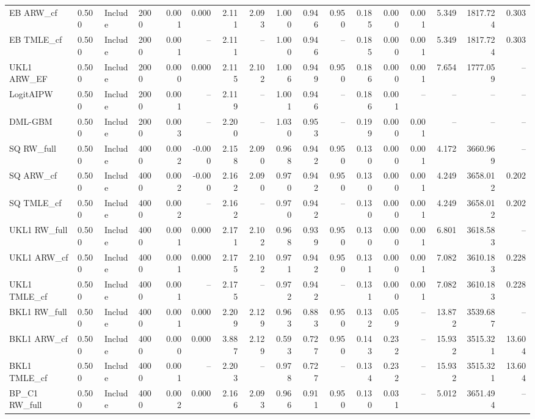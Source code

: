\begin{tabular}{llllrrrrrrrrrrrrr}
EB ARW\_cf & 0.500 & Include & 2000 & 0.001 & 0.000 & 2.111 & 2.093 & 1.000 & 0.946 & 0.950 & 0.185 & 0.000 & 0.001 & 5.349 & 1817.724 & 0.303 \\
EB TMLE\_cf & 0.500 & Include & 2000 & 0.001 & -- & 2.111 & -- & 1.000 & 0.946 & -- & 0.185 & 0.000 & 0.001 & 5.349 & 1817.724 & 0.303 \\
UKL1 ARW\_EF & 0.500 & Include & 2000 & 0.000 & 0.000 & 2.115 & 2.102 & 1.006 & 0.949 & 0.950 & 0.186 & 0.000 & 0.001 & 7.654 & 1777.059 & -- \\
LogitAIPW & 0.500 & Include & 2000 & 0.001 & -- & 2.119 & -- & 1.001 & 0.946 & -- & 0.186 & 0.001 & -- & -- & -- & -- \\
DML-GBM & 0.500 & Include & 2000 & 0.003 & -- & 2.200 & -- & 1.030 & 0.953 & -- & 0.199 & 0.000 & 0.001 & -- & -- & -- \\
SQ RW\_full & 0.500 & Include & 4000 & 0.002 & -0.000 & 2.158 & 2.090 & 0.968 & 0.942 & 0.950 & 0.130 & 0.000 & 0.001 & 4.172 & 3660.969 & -- \\
SQ ARW\_cf & 0.500 & Include & 4000 & 0.002 & -0.000 & 2.162 & 2.090 & 0.970 & 0.942 & 0.950 & 0.130 & 0.000 & 0.001 & 4.249 & 3658.012 & 0.202 \\
SQ TMLE\_cf & 0.500 & Include & 4000 & 0.002 & -- & 2.162 & -- & 0.970 & 0.942 & -- & 0.130 & 0.000 & 0.001 & 4.249 & 3658.012 & 0.202 \\
UKL1 RW\_full & 0.500 & Include & 4000 & 0.001 & 0.000 & 2.171 & 2.102 & 0.968 & 0.939 & 0.950 & 0.130 & 0.000 & 0.001 & 6.801 & 3618.583 & -- \\
UKL1 ARW\_cf & 0.500 & Include & 4000 & 0.001 & 0.000 & 2.175 & 2.102 & 0.971 & 0.942 & 0.950 & 0.131 & 0.000 & 0.001 & 7.082 & 3610.183 & 0.228 \\
UKL1 TMLE\_cf & 0.500 & Include & 4000 & 0.001 & -- & 2.175 & -- & 0.972 & 0.942 & -- & 0.131 & 0.000 & 0.001 & 7.082 & 3610.183 & 0.228 \\
BKL1 RW\_full & 0.500 & Include & 4000 & 0.001 & 0.000 & 2.209 & 2.129 & 0.963 & 0.883 & 0.950 & 0.132 & 0.059 & -- & 13.872 & 3539.687 & -- \\
BKL1 ARW\_cf & 0.500 & Include & 4000 & 0.000 & 0.000 & 3.887 & 2.129 & 0.593 & 0.727 & 0.950 & 0.143 & 0.232 & -- & 15.932 & 3515.321 & 13.604 \\
BKL1 TMLE\_cf & 0.500 & Include & 4000 & 0.001 & -- & 2.203 & -- & 0.978 & 0.727 & -- & 0.134 & 0.232 & -- & 15.932 & 3515.321 & 13.604 \\
BP\_C1 RW\_full & 0.500 & Include & 4000 & 0.002 & 0.000 & 2.166 & 2.093 & 0.966 & 0.911 & 0.950 & 0.130 & 0.031 & -- & 5.012 & 3651.494 & -- \\

\end{tabular}
